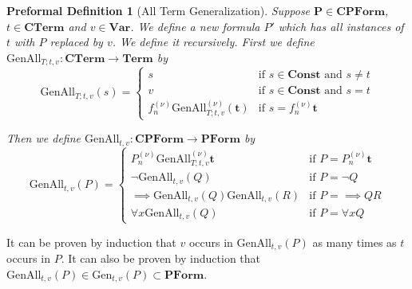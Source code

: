 \documentclass[oneside, 12pt]{book}
\theoremstyle{break}
\newtheorem{preformal definition}[definition]{Preformal Definition}
\newtheorem{preformal theorem}[theorem]{Preformal Theorem}
\newcommand{\bv}[1]{\boldsymbol{#1}}
\begin{document}
		\begin{preformal definition}[All Term Generalization]
			Suppose $\bv{P} \in \textbf{CPForm}$, $t\in \textbf{CTerm}$ and $v\in \textbf{Var}$.
			We define a new formula $P'$ which has all instances of $t$ with $P$ replaced by $v$. 
			We define it recursively. 
			First we define $\text{GenAll}_{T;t, v}: \textbf{CTerm} \to \textbf{Term}$ by
			\begin{equation*}
				\text{GenAll}_{T;t, v}(s) = \begin{cases}
					s & \text{if } s\in \textbf{Const} \text{ and } s \neq t\\	
					v & \text{if } s\in \textbf{Const} \text{ and } s = t\\
					f_n^{(\nu)} \text{GenAll}_{T;t, v}^{(\nu)}(\bv{t}) & \text{if } s = f_n^{(\nu)}\bv{t}
				\end{cases}
			\end{equation*}
			
			Then we define $\text{GenAll}_{t, v}:\textbf{CPForm} \to \textbf{PForm}$ by
			\begin{equation*}
				\text{GenAll}_{t, v}(P) = \begin{cases}
					P_n^{(\nu)}\text{GenAll}_{T;t, v}^{(\nu)}\bv{t} & \text{if } P = P_n^{(\nu)}\bv{t}\\
					\lnot \text{GenAll}_{t, v}(Q) &\text{if } P = \lnot Q\\
					\implies \text{GenAll}_{t, v}(Q)\text{GenAll}_{t, v}(R) &\text{if } P = \implies QR\\
					\forall x \text{GenAll}_{t, v}(Q) &\text{if } P = \forall x Q
				\end{cases}
			\end{equation*}
		\end{preformal definition}
		It can be proven by induction that $v$ occurs in $\text{GenAll}_{t, v}(P)$ as many times as $t$ occurs in $P$.
		It can also be proven by induction that $\text{GenAll}_{t, v}(P) \in \text{Gen}_{t, v}(P) \subset \textbf{PForm}$.
	
\end{document}
